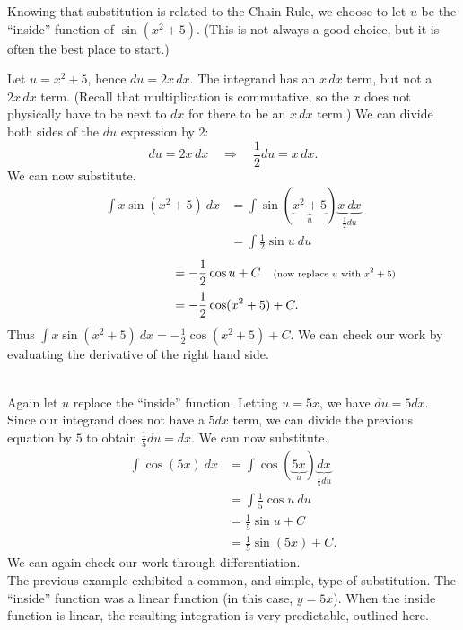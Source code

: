 {Knowing that substitution is related to the Chain Rule, we choose to let $u$ be the ``inside'' function of $\sin(x^2+5)$. (This is not always a good choice, but it is often the best place to start.)

Let $u = x^2+5$, hence $du = 2x\,dx$. The integrand has an $x\,dx$ term, but not a $2x\,dx$ term. (Recall that multiplication is commutative, so the $x$ does not physically have to be next to $dx$ for there to be an $x\,dx$ term.) We can divide both sides of the $du$ expression by 2:
	$$du = 2x\,dx \quad \Rightarrow \quad \frac12du = x\,dx.$$ We can now substitute.
	\begin{align*}\int x\sin(x^2+5)\ dx &= \int \sin(\underbrace{x^2+5}_u) \underbrace{x\ dx}_{\frac12du}\\
						 &= \int \frac12\sin u\ du
\end{align*}
\begin{align*}
			\phantom{\int x\sin(x^2+5)\ dx} &= -\frac12\cos u + C \quad \text{\scriptsize (now replace $u$ with $x^2+5$)}\\
						 &=-\frac12\cos(x^2+5) + C.
	\end{align*}
Thus $\int x\sin(x^2+5)\ dx = -\frac12\cos(x^2+5)+C$. We can check our work by evaluating the derivative of the right hand side.
}\\

{Again let $u$ replace the ``inside'' function. Letting $u = 5x$, we have $du = 5dx$. Since our integrand does not have a $5dx$ term, we can divide the previous equation by $5$ to obtain $\frac15du = dx$. We can now substitute.
\begin{align*}
	\int \cos(5x)\ dx &= \int \cos(\underbrace{5x}_u) \underbrace{dx}_{\frac15du} \\
									&=	\int \frac15\cos u \ du \\
									&= \frac15\sin u + C \\
									&= \frac15\sin (5x)+C.
\end{align*}
We can again check our work through differentiation.
}\\

The previous example exhibited a common, and simple, type of substitution. The ``inside'' function was a linear function (in this case, $y = 5x$). When the inside function is linear, the resulting integration is very predictable, outlined here.

